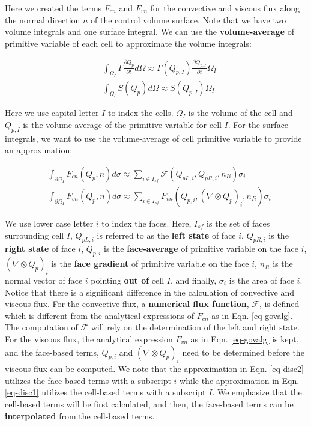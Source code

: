 \documentclass[12pt, letterpaper]{report}
\begin{document}
Here we created the terms $F_{cn}$ and $F_{vn}$ for the convective and viscous flux along the normal
direction $n$ of the control volume surface. Note that we have two volume integrals and one surface
integral. We can use the {\bf volume-average} of primitive variable of each cell to approximate the
volume integrals:

\begin{subequations}\label{eq-disc1}
   \begin{align}
      &\int_{\Omega_I} \Gamma \frac{\partial Q_p}{\partial t} d\Omega \approx \Gamma(Q_{p,I}) \frac{\partial
      Q_{p,I}}{\partial t} \Omega_I \\
      &\int_{\Omega_I} S(Q_p) d\Omega \approx S(Q_{p,I}) \Omega_I
   \end{align}
\end{subequations}

Here we use capital letter $I$ to index the cells. $\Omega_I$ is the volume of the cell and
$Q_{p,I}$ is the volume-average of the primitive variable for cell $I$. For the surface integrals,
we want to use the volume-average of cell primitive variable to provide an approximation:

\begin{subequations}\label{eq-disc2}
   \begin{align}
      &\int_{\partial\Omega_I} F_{cn}(Q_p, n) d\sigma \approx \sum_{i \in I_{sf}} \mathcal{F}(Q_{pL,i},
      Q_{pR,i}, n_{Ii}) \sigma_i \\
      &\int_{\partial\Omega_I} F_{vn}(Q_p, n) d\sigma \approx \sum_{i \in I_{sf}} F_{vn}(Q_{p,i},
      (\nabla \mathop{\otimes} Q_p)_i, n_{Ii}) \sigma_i
   \end{align}
\end{subequations}

We use lower case letter $i$ to index the faces. Here, $I_{sf}$ is the set of faces surrounding cell
$I$, $Q_{pL,i}$ is referred to as the {\bf left state} of face $i$, $Q_{pR,i}$ is the {\bf right
state} of face $i$, $Q_{p,i}$ is the {\bf face-average} of primitive variable on the face $i$,
$(\nabla \mathop{\otimes} Q_p)_i$ is the {\bf face gradient} of primitive variable on the face $i$,
$n_{Ii}$ is the normal vector of face $i$ pointing {\bf out of} cell $I$, and finally, $\sigma_i$ is
the area of face $i$. Notice that there is a significant difference in the calculation of convective
and viscous flux. For the convective flux, a {\bf numerical flux function}, $\mathcal{F}$, is
defined which is different from the analytical expressions of $F_{cn}$ as in Eqn. \ref{eq-govalg}.
The computation of $\mathcal{F}$ will rely on the determination of the left and right state. For the
viscous flux, the analytical expression $F_{vn}$ as in Eqn. \ref{eq-govalg} is kept, and the
face-based terms, $Q_{p,i}$ and $(\nabla \mathop{\otimes} Q_p)_i$ need to be determined before the
viscous flux can be computed. We note that the approximation in Eqn. \ref{eq-disc2} utilizes the
face-based terms with a subscript $i$ while the approximation in Eqn. \ref{eq-disc1} utilizes the
cell-based terms with a subscript $I$. We emphasize that the cell-based terms will be first
calculated, and then, the face-based terms can be {\bf interpolated} from the cell-based terms.
\paraspace
\end{document}
